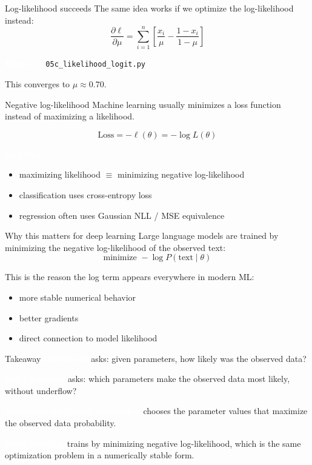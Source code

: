 \documentclass[aspectratio=169]{beamer}
\renewcommand{\textbf}[1]{\textcolor{white}{\bfseries #1}}
\begin{document}
\begin{frame}[c]{Log-likelihood succeeds}
The same idea works if we optimize the log-likelihood instead:
\[
\frac{\partial \ell}{\partial \mu}
=\sum_{i=1}^n\left[\frac{x_i}{\mu} - \frac{1-x_i}{1-\mu}\right]
\]

\vspace{0.5em}
\textbf{Demo C:} \texttt{05c\_likelihood\_logit.py}

\vspace{0.5em}
This converges to $\mu \approx 0.70$.
\end{frame}

\begin{frame}[c]{Negative log-likelihood}
Machine learning usually minimizes a loss function instead of maximizing a likelihood.

\[
\text{Loss} = -\ell(\theta) = -\log L(\theta)
\]

\vspace{0.5em}
\textbf{Key idea:}
\begin{itemize}
    \item maximizing likelihood $\equiv$ minimizing negative log-likelihood
    \item classification uses cross-entropy loss
    \item regression often uses Gaussian NLL / MSE equivalence
\end{itemize}
\end{frame}

\begin{frame}[c]{Why this matters for deep learning}
Large language models are trained by minimizing the negative log-likelihood of the observed text:
\[
\text{minimize } -\log P(\text{text} \mid \theta)
\]

\vspace{0.5em}
This is the reason the log term appears everywhere in modern ML:
\begin{itemize}
    \item more stable numerical behavior
    \item better gradients
    \item direct connection to model likelihood
\end{itemize}
\end{frame}

\begin{frame}[c]{Takeaway}
\textbf{Likelihood} asks: given parameters, how likely was the observed data?

\textbf{Log-likelihood} asks: which parameters make the observed data most likely, without underflow?

\vspace{0.5em}
\textbf{Maximum-likelihood estimation} chooses the parameter values that maximize the observed data probability.

\vspace{0.5em}
\textbf{Deep learning} trains by minimizing negative log-likelihood, which is the same optimization problem in a numerically stable form.
\end{frame}
\end{document}
